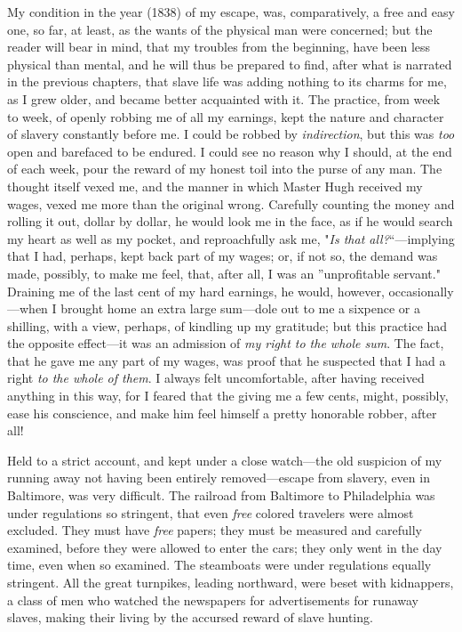 My condition in the year (1838) of my escape, was, comparatively, a free
and easy one, so far, at least, as the wants of the physical man were
concerned; but the reader will bear in mind, that my troubles from the
beginning, have been less physical than mental, and he will thus be
prepared to find, after what is narrated in the previous chapters, that
slave life was adding nothing to its charms for me, as I grew older, and
became better acquainted with it. The practice, from week to week, of
openly robbing me of all my earnings, kept the nature and character of
slavery constantly before me. I could be robbed by \emph{indirection},
but this was \emph{too} open and barefaced to be endured. I could see no
reason why I should, at the end of each week, pour the reward of my
honest toil into the purse of any man. The thought itself vexed me, and
the manner in which Master Hugh received my wages, vexed me more than
the original wrong. Carefully counting the money and rolling it out,
dollar by dollar, he would look me in the face, as if he would search my
heart as well as my pocket, and reproachfully ask me, "\emph{Is that
all?}``---implying that I had, perhaps, kept back part of my wages; or,
if not so, the demand was made, possibly, to make me feel, that, after
all, I was an ''unprofitable servant." Draining me of the last cent of
my hard earnings, he would, however, occasionally---when I brought home
an extra large sum---dole out to me a sixpence or a shilling, with a
view, perhaps, of kindling up my
{\protect\hypertarget{326}{}{}}gratitude; but this practice had the
opposite effect---it was an admission of \emph{my right to the whole
sum}. The fact, that he gave me any part of my wages, was proof that he
suspected that I had a right \emph{to the whole of them}. I always felt
uncomfortable, after having received anything in this way, for I feared
that the giving me a few cents, might, possibly, ease his conscience,
and make him feel himself a pretty honorable robber, after all!

Held to a strict account, and kept under a close watch---the old
suspicion of my running away not having been entirely removed---escape
from slavery, even in Baltimore, was very difficult. The railroad from
Baltimore to Philadelphia was under regulations so stringent, that even
\emph{free} colored travelers were almost excluded. They must have
\emph{free} papers; they must be measured and carefully examined, before
they were allowed to enter the cars; they only went in the day time,
even when so examined. The steamboats were under regulations equally
stringent. All the great turnpikes, leading northward, were beset with
kidnappers, a class of men who watched the newspapers for advertisements
for runaway slaves, making their living by the accursed reward of slave
hunting.

